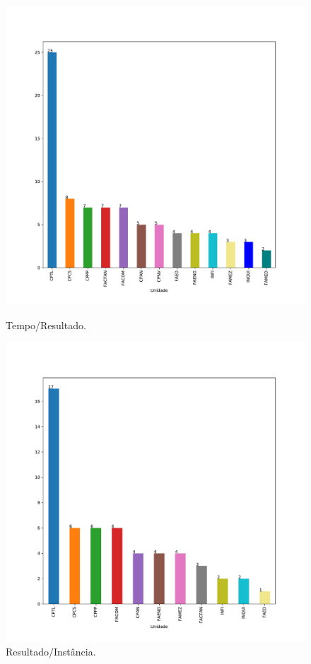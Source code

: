 \documentclass[a4paper, 12pt]{article}
\begin{document}
\begin{figure}[!htb]
    \centering
    \begin{minipage}{0.5\textwidth}
        \centering
        \includegraphics[width=1\textwidth]{../Resultados/img/pets_bar_2018.pdf}
        \caption{Tempo/Resultado.}
        \label{fig:scatter_topDown}
    \end{minipage}%
    \begin{minipage}{0.5\textwidth}
        \centering
        \includegraphics[width=1\textwidth]{../Resultados/img/pets_bar_2019.pdf}
        \caption{Resultado/Instância.}
        \label{fig:result_topDown}
    \end{minipage}
\end{figure}
\clearpage
\end{document}
